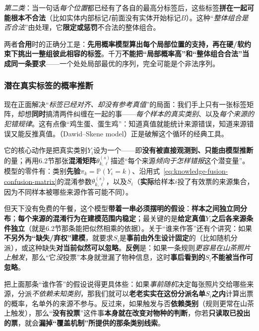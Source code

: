 \emph{第二类}：当一句话\emph{每个位置}都已经有了各自的最高分标签后，这些标签\textbf{拼在一起可能根本不合法}（比如实体内部标记$I$前面没有实体开始标记$B$）。这种“\emph{整体组合是否合法}”由处理，它\textbf{限定或惩罚}不合法的整体组合。

两者\textbf{合用}时的正确分工是：\textbf{先用概率模型算出每个局部位置的支持，再在硬/软约束下挑出一整组彼此相容的标签}。千万\textbf{不能把“局部概率高”和“整体组合合法”当成同一条要求}——一个处处局部最优的序列，完全可能是个非法序列。

\subsubsection{潜在真实标签的概率推断}
\label{sec:knowledge-fusion-latent-label-inference}

现在正面解决“\emph{标签已经对齐、却没有参考真值}”的局面：我们手上只有一张标签矩阵，却想\textbf{同时}搞清两件纠缠在一起的事——\emph{每个样本的真实类别}、以及\emph{每个来源的犯错规律}。这有点像“鸡生蛋、蛋生鸡”：知道真值就能统计来源错误，知道来源错误又能反推真值。（Dawid--Skene model）正是破解这个循环的经典工具。

它的核心动作是把真实类别$Y_i$设为一个——即\textbf{没有被直接观测到、只能由模型推断}的量；再用6.2节那张\textbf{混淆矩阵}$\theta^{(s)}_{k,\ell}$描述“每个来源\emph{倾向于怎样错报}这个潜变量”。模型的零件有：类别\textbf{先验}$\pi_k=\mathbb{P}(Y_i=k)$、沿用式~\eqref{eq:knowledge-fusion-confusion-matrix}的混淆参数$\theta^{(s)}_{k,\ell}$，以及$S_i$（\textbf{实际}给样本$i$投了有效票的来源集合，因为不同样本被哪些来源作答可能不同）。

但天下没有免费的午餐，这个模型\textbf{带着一串必须摆明的假设}：\textbf{样本之间独立同分布}；\textbf{每个来源的混淆行为在建模范围内稳定}；最关键的是\textbf{给定真值$Y_i$之后各来源条件独立}（就是6.2节那条能把似然相乘的依据）。关于“谁来作答”还有个讲究：如果\textbf{不另外为“缺失/弃权”建模}，就要求$S_i$是\textbf{事前由外生设计固定}的（比如随机分派），或这种缺失\textbf{对当前似然可以忽略}。\textbf{反例}是：如果一条规则\emph{更容易在山茶照片上触发}，那么“它\emph{没}投票”本身就泄漏了物种信息，这时\textbf{事后看到的}$S_i$\textbf{不能被当作可忽略}。

把上面那条“谁作答”的假设说得更具体些：如果\emph{事前随机}决定每张照片交给哪些来源，分派\emph{不依赖未知类别}，那我们就可以\textbf{老老实实在这份分派名单$S_i$之内}计算出票的概率，名单外的来源不参与。反过来，如果触发与否\textbf{依赖类别}（规则更常在山茶上触发），那么“\textbf{没有投票}”这件事\textbf{本身就在改变对物种的判断}，你若\textbf{只读取已投出的票}，就会\textbf{漏掉“覆盖机制”所提供的那条类别线索}。

